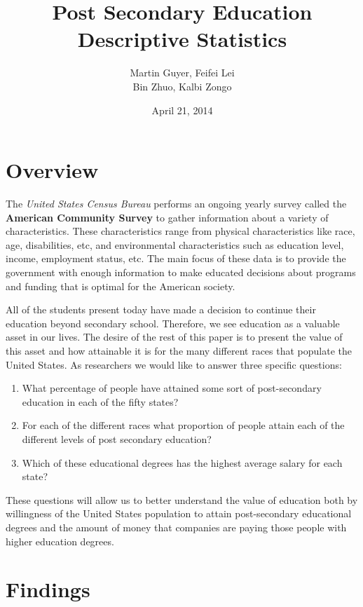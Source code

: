 \documentclass{article}
\title{Post Secondary Education Descriptive Statistics}
\author{Martin Guyer,  Feifei  Lei \\ Bin Zhuo, Kalbi Zongo}
\date{April 21, 2014}
\begin{document}
\maketitle

\section{Overview}

The \emph{United States Census Bureau} performs an ongoing yearly survey called the \textbf{American Community
Survey} to gather information about a variety of characteristics. These characteristics range from physical characteristics
like race, age, disabilities, etc, and environmental characteristics such as education level, income, employment status, etc. 
The main focus of these data is to provide the government with enough information to make educated decisions about 
programs and funding that is optimal for the American society. 

All of the students present today have made a decision to continue their education beyond secondary school. Therefore,
we see education as a valuable asset in our lives. The desire of the rest of this paper is to present the value of this asset and
how attainable it is for the many different races that populate the United States. As researchers we would like to answer 
three specific questions:
	\begin{enumerate}
	\item What percentage of people have attained some sort of post-secondary education in each of the fifty states?
	
	\item For each of the different races what proportion of people
  attain each of the different levels of post secondary education? 
	
	\item Which of these educational degrees has the highest average salary for each state?
	\end{enumerate}
These questions will allow us to better understand the value of education both by willingness of the United States
population to attain post-secondary educational degrees and the amount of money that companies are paying
those people with higher education degrees. 

\section{Findings}
\end{document}
